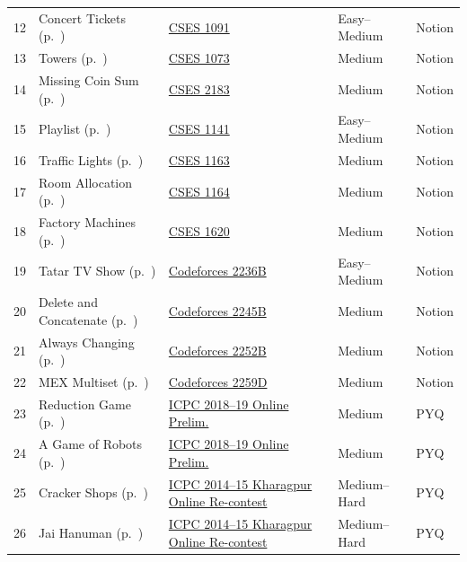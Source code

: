 {\begin{longtable}{r >{\raggedright\arraybackslash}p{4.6cm} >{\raggedright\arraybackslash}p{5.6cm} l l}
12 & Concert Tickets (p.~\pageref{sec:g-concert}) & \href{https://cses.fi/problemset/task/1091}{CSES 1091} & Easy--Medium & Notion\\
13 & Towers (p.~\pageref{sec:g-towers}) & \href{https://cses.fi/problemset/task/1073}{CSES 1073} & Medium & Notion\\
14 & Missing Coin Sum (p.~\pageref{sec:g-missing-coin}) & \href{https://cses.fi/problemset/task/2183}{CSES 2183} & Medium & Notion\\
15 & Playlist (p.~\pageref{sec:g-playlist}) & \href{https://cses.fi/problemset/task/1141}{CSES 1141} & Easy--Medium & Notion\\
16 & Traffic Lights (p.~\pageref{sec:g-traffic}) & \href{https://cses.fi/problemset/task/1163}{CSES 1163} & Medium & Notion\\
17 & Room Allocation (p.~\pageref{sec:g-room}) & \href{https://cses.fi/problemset/task/1164}{CSES 1164} & Medium & Notion\\
18 & Factory Machines (p.~\pageref{sec:g-factory}) & \href{https://cses.fi/problemset/task/1620}{CSES 1620} & Medium & Notion\\
19 & Tatar TV Show (p.~\pageref{sec:g-tatar}) & \href{https://codeforces.com/problemset/problem/2236/B}{Codeforces 2236B} & Easy--Medium & Notion\\
20 & Delete and Concatenate (p.~\pageref{sec:g-delete-concat}) & \href{https://codeforces.com/problemset/problem/2245/B}{Codeforces 2245B} & Medium & Notion\\
21 & Always Changing (p.~\pageref{sec:g-always-changing}) & \href{https://codeforces.com/problemset/problem/2252/B}{Codeforces 2252B} & Medium & Notion\\
22 & MEX Multiset (p.~\pageref{sec:g-mex-multiset}) & \href{https://codeforces.com/problemset/problem/2259/D}{Codeforces 2259D} & Medium & Notion\\
23 & Reduction Game (p.~\pageref{sec:g-reduction-game}) & \href{https://www.codechef.com/problems/REDCGAME}{ICPC 2018--19 Online Prelim.} & Medium & PYQ\\
24 & A Game of Robots (p.~\pageref{sec:g-robots}) & \href{https://www.codechef.com/problems/ROBOGAME}{ICPC 2018--19 Online Prelim.} & Medium & PYQ\\
25 & Cracker Shops (p.~\pageref{sec:g-cracker-shops}) & \href{https://www.codechef.com/problems/ACM14KG1}{ICPC 2014--15 Kharagpur Online Re-contest} & Medium--Hard & PYQ\\
26 & Jai Hanuman (p.~\pageref{sec:g-jai-hanuman}) & \href{https://www.codechef.com/problems/ACM14KG4}{ICPC 2014--15 Kharagpur Online Re-contest} & Medium--Hard & PYQ\\

\end{longtable}}
